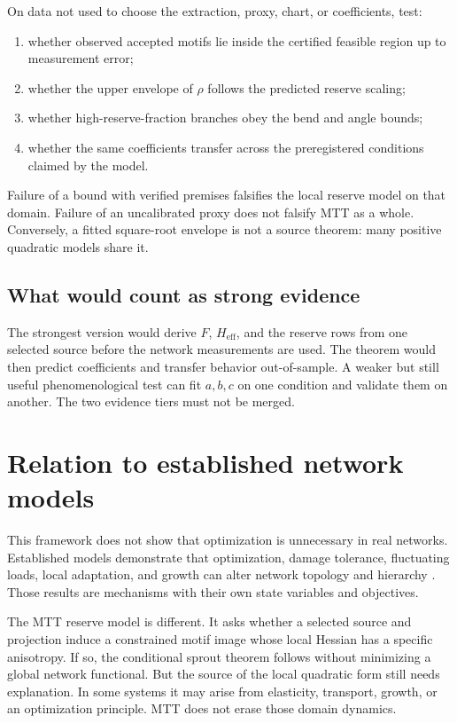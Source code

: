 \documentclass[11pt]{article}
\begin{document}
On data not used to choose the extraction, proxy, chart, or coefficients,
test:

\begin{enumerate}
\item whether observed accepted motifs lie inside the certified feasible
region up to measurement error;
\item whether the upper envelope of $\rho$ follows the predicted reserve
scaling;
\item whether high-reserve-fraction branches obey the bend and angle bounds;
\item whether the same coefficients transfer across the preregistered
conditions claimed by the model.
\end{enumerate}

Failure of a bound with verified premises falsifies the local reserve model
on that domain.  Failure of an uncalibrated proxy does not falsify MTT as a
whole.  Conversely, a fitted square-root envelope is not a source theorem:
many positive quadratic models share it.

\subsection{What would count as strong evidence}

The strongest version would derive $F$, $H_{\mathrm{eff}}$, and the reserve
rows from one selected source before the network measurements are used.
The theorem would then predict coefficients and transfer behavior
out-of-sample.  A weaker but still useful phenomenological test can fit
$a,b,c$ on one condition and validate them on another.  The two evidence
tiers must not be merged.

\section{Relation to established network models}

This framework does not show that optimization is unnecessary in real
networks.  Established models demonstrate that optimization, damage
tolerance, fluctuating loads, local adaptation, and growth can alter network
topology and hierarchy \cite{katifori2010,corson2010,ronellenfitsch2016}.
Those results are mechanisms with their own state variables and objectives.

The MTT reserve model is different.  It asks whether a selected source and
projection induce a constrained motif image whose local Hessian has a
specific anisotropy.  If so, the conditional sprout theorem follows without
minimizing a global network functional.  But the source of the local
quadratic form still needs explanation.  In some systems it may arise from
elasticity, transport, growth, or an optimization principle.  MTT does not
erase those domain dynamics.
\end{document}
